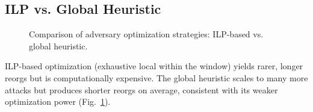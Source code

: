 \subsection{ILP vs. Global Heuristic}
\begin{figure}
\caption{Comparison of adversary optimization strategies: ILP-based vs. global heuristic.}
\label{fig:optimization}
\end{figure}
ILP-based optimization (exhaustive local within the window) yields rarer, longer reorgs but is computationally expensive. The global heuristic scales to many more attacks but produces shorter reorgs on average, consistent with its weaker optimization power (Fig.~\ref{fig:optimization}).

